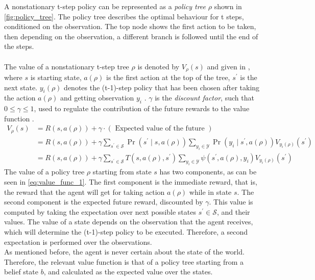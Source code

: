 A nonstationary t-step policy can be represented as a \textit{policy tree} $ \rho $ shown in \autoref{fig:policy_tree}. The policy tree describes the optimal behaviour for t steps, conditioned on the observation. The top node shows the first action to be taken, then depending on the observation, a different branch is followed until the end of the steps. \\\\
The value of a nonstationary t-step tree $ \rho $ is denoted by $ V_\rho(s) $ and given in , where $ s $ is starting state, $ a(\rho) $ is the first action at the top of the tree, $ s^\prime $ is the next state. $ y_{i}(\rho) $ denotes the (t-1)-step policy that has been chosen after taking the action $ a(\rho) $ and getting observation $ y_i $ \cite{KAELBLING199899}. $ \gamma $ is the \textit{discount factor}, such that $ 0\leq \gamma \leq 1 $, used to regulate the contribution of the future rewards to the value function \cite{Sutton2018}.
\begin{align} 
V_{\rho}(s) &=R(s, a(\rho))+\gamma \cdot(\text { Expected value of the future }) \label{eq:value_func_1}\\
&=R(s, a(\rho))+\gamma \sum_{s^{\prime} \in \mathcal{S}} \operatorname{Pr}\left(s^{\prime} \mid s, a(\rho)\right) \sum_{y_{i} \in \mathcal{Y}} \operatorname{Pr}\left(y_{i} \mid s^{\prime}, a(\rho)\right) V_{y_{i}(\rho)}\left(s^{\prime}\right) \label{eq:value_func_2}\\
&=R(s, a(\rho))+\gamma \sum_{s^{\prime} \in \mathcal{S}} T\left(s, a(\rho), s^{\prime}\right) \sum_{y_{i} \in \mathcal{Y}} \psi\left(s^{\prime}, a(\rho), y_{i}\right) V_{y_{i}(\rho)}\left(s^{\prime}\right) \label{eq:value_of_tree}
\end{align}
The value of a policy tree $ \rho $ starting from state $ s $ has two components, as can be seen in \autoref{eq:value_func_1}. The first component is the immediate reward, that is, the reward that the agent will get for taking action $ a(\rho) $ while in state $ s $. The second component is the expected future reward, discounted by $ \gamma $. This value is computed by taking the expectation over next possible states $ s^\prime \in \mathcal{S} $, and their values. The value of a state depends on the observation that the agent receives, which will determine the (t-1)-step policy to be executed. Therefore, a second expectation is performed over the observations. \\
As mentioned before, the agent is never certain about the state of the world. Therefore, the relevant value function is that of a policy tree starting from a belief state $ b $, and  calculated as the expected value over the states.
